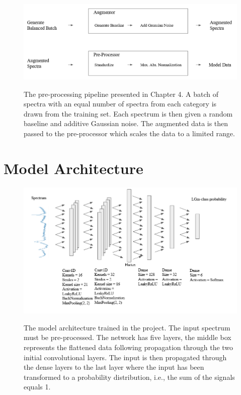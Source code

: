 \documentclass[a4paper, 12pt, oneside]{book}
\begin{document}
\begin{appendices}
\label{appendix:prep}


\begin{figure}[H]

    \centering
{\includegraphics[width=16cm]{images/preprocessing.png} }
\caption{The pre-processing pipeline presented in Chapter 4. A batch of spectra with an equal number of spectra from each category is drawn from the training set. Each spectrum is then given a random baseline and additive Gaussian noise. The augmented data is then passed to the pre-processor which scales the data to a limited range.}

\end{figure}

\chapter{Model Architecture}

\label{appendix:model}

\begin{figure}[H]

    \centering
{\includegraphics[width=16cm]{images/model.png} }
\caption{The model architecture trained in the project. The input spectrum must be pre-processed. The network has five layers, the middle box represents the flattened data following propagation through the two initial convolutional layers. The input is then propagated through the dense layers to the last layer where the input has been transformed to a probability distribution, i.e., the sum of the signals equals 1.}

\end{figure}


\end{appendices}
\end{document}
